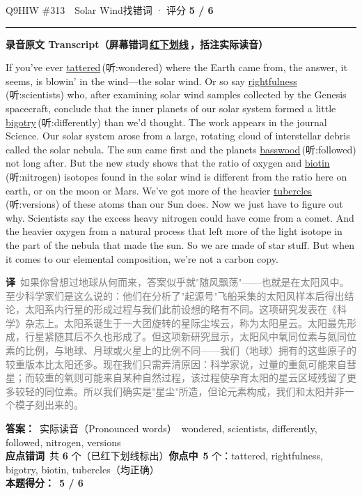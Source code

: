 \documentclass[11pt]{article}
\newcommand{\ptesub}[1]{%
  \par\needspace{2\baselineskip}\smallskip
  {\color{cAccent}\rule[-0.2ex]{3pt}{1.05em}}\hspace{6pt}%
  {\bfseries\color{cHead}#1}\par\nopagebreak\smallskip}
\newcommand{\zh}[1]{{\footnotesize\textcolor{cNote}{\textbf{译}}\ \textcolor{gray}{#1}}}
\newcommand{\hiw}[2]{{\color{cWrong}\uline{#1}}\,{\footnotesize\color{cFix}(听:#2)}} %
\begin{document}
\begin{qblock}{Q9\quad HIW \#313\ \ Solar Wind}{找错词 · 评分 \textcolor{cAccent}{\bfseries 5 / 6}}
\ptesub{录音原文 Transcript（屏幕错词\,{\color{cWrong}\uline{红下划线}}\,，括注实际读音）}
\begin{promptbox}
If you've ever \hiw{tattered}{wondered} where the Earth came from, the answer, it seems, is blowin' in the wind---the solar wind. Or so say \hiw{rightfulness}{scientists} who, after examining solar wind samples collected by the Genesis spacecraft, conclude that the inner planets of our solar system formed a little \hiw{bigotry}{differently} than we'd thought. The work appears in the journal Science. Our solar system arose from a large, rotating cloud of interstellar debris called the solar nebula. The sun came first and the planets \hiw{basswood}{followed} not long after. But the new study shows that the ratio of oxygen and \hiw{biotin}{nitrogen} isotopes found in the solar wind is different from the ratio here on earth, or on the moon or Mars. We've got more of the heavier \hiw{tubercles}{versions} of these atoms than our Sun does. Now we just have to figure out why. Scientists say the excess heavy nitrogen could have come from a comet. And the heavier oxygen from a natural process that left more of the light isotope in the part of the nebula that made the sun. So we are made of star stuff. But when it comes to our elemental composition, we're not a carbon copy.
\end{promptbox}
\zh{如果你曾想过地球从何而来，答案似乎就"随风飘荡"——也就是在太阳风中。至少科学家们是这么说的：他们在分析了"起源号"飞船采集的太阳风样本后得出结论，太阳系内行星的形成过程与我们此前设想的略有不同。这项研究发表在《科学》杂志上。太阳系诞生于一大团旋转的星际尘埃云，称为太阳星云。太阳最先形成，行星紧随其后不久也形成了。但这项新研究显示，太阳风中氧同位素与氮同位素的比例，与地球、月球或火星上的比例不同——我们（地球）拥有的这些原子的较重版本比太阳还多。现在我们只需弄清原因：科学家说，过量的重氮可能来自彗星；而较重的氧则可能来自某种自然过程，该过程使孕育太阳的星云区域残留了更多较轻的同位素。所以我们确实是"星尘"所造，但论元素构成，我们和太阳并非一个模子刻出来的。}
\par\smallskip
\textbf{答案：}\ 实际读音（Pronounced words）\ {\color{cFix}wondered, scientists, differently, followed, nitrogen, versions}\\
\textbf{应点错词}\ 共 \textbf{6} 个（已红下划线标出）\qquad\textbf{你点中}\ \textbf{5} 个：tattered, rightfulness, bigotry, biotin, tubercles（均正确）\\[2pt]\textbf{本题得分：}\ {\color{cAccent}\bfseries 5 / 6}
\end{qblock}
\end{document}
